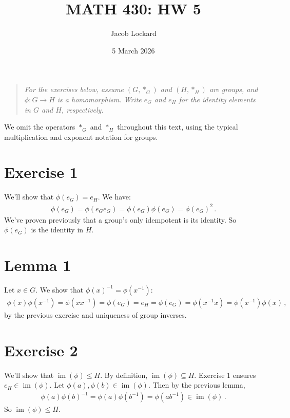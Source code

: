 \documentclass{article}
\DeclareMathOperator{\im}{im}
\begin{document}
\title{MATH 430: HW 5}
\author{Jacob Lockard}
\date{5 March 2026}

\maketitle

\begin{quote}
    \itshape
    For the exercises below, assume $(G, *_G)$ and $(H, *_H)$ are groups,
    and $\phi : G \to H$ is a homomorphism. Write $e_G$ and $e_H$
    for the identity elements in $G$ and $H$, respectively.
\end{quote}

We omit the operators $*_G$ and $*_H$ throughout this text, using the typical
multiplication and exponent notation for groups.

\section*{Exercise 1}

We'll show that $\phi(e_G) = e_H$. We have:
\begin{align*}
    \phi(e_G) = \phi(e_G e_G) = \phi(e_G) \phi(e_G) = \phi(e_G)^2 \,.
\end{align*}
We've proven previously that a group's only idempotent is its identity.
So $\phi(e_G)$ is the identity in $H$.
\qedsymbol

\section*{Lemma 1}

Let $x \in G$. We show that $\phi(x)^{-1} = \phi(x^{-1})$:
\begin{align*}
    \phi(x)\phi(x^{-1}) = \phi(xx^{-1}) = \phi(e_G) = e_H =
    \phi(e_G) = \phi(x^{-1}x) = \phi(x^{-1})\phi(x) \,,
\end{align*}
by the previous exercise and uniqueness of group inverses.
\qedsymbol

\section*{Exercise 2}

We'll show that $\im(\phi) \leq H$. By definition, $\im(\phi) \subseteq H$.
Exercise 1 ensures $e_H \in \im(\phi)$.
Let $\phi(a), \phi(b) \in \im(\phi)$.
Then by the previous lemma,
\begin{align*}
    \phi(a) \phi(b)^{-1} = \phi(a) \phi(b^{-1}) = \phi(ab^{-1}) \in \im(\phi) \,.
\end{align*}
So $\im(\phi) \leq H$.
\qedsymbol
\end{document}
